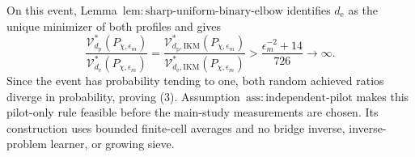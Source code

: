 On this event, Lemma~\(\mathrm{lem{:}sharp\text{-}uniform\text{-}binary\text{-}elbow}\) identifies \(d_{\mathrm e}\) as the unique minimizer of both profiles and gives
\[
 \frac{\mathcal V_{d_{\mathrm p}}^*(P_{\chi,\epsilon_m})}
 {\mathcal V_{d_{\mathrm e}}^*(P_{\chi,\epsilon_m})}
 =\frac{\mathcal V_{d_{\mathrm p},\mathrm{IKM}}^*(P_{\chi,\epsilon_m})}
 {\mathcal V_{d_{\mathrm e},\mathrm{IKM}}^*(P_{\chi,\epsilon_m})}
 >\frac{\epsilon_m^{-2}+14}{726}\longrightarrow\infty.  \tag{46}
\]
Since the event has probability tending to one, both random achieved ratios diverge in probability, proving (3). Assumption~\(\mathrm{ass{:}independent\text{-}pilot}\) makes this pilot-only rule feasible before the main-study measurements are chosen. Its construction uses bounded finite-cell averages and no bridge inverse, inverse-problem learner, or growing sieve.